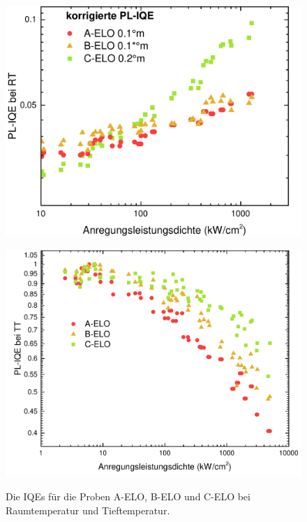\begin{figure}[h]
  \centering
  \begin{minipage}[t]{0.49\textwidth}
    \centering
    \includegraphics[width=\textwidth]{Bilder/TS4045/corrIQERT.pdf}
    \label{fig:eloiqeRT}
  \end{minipage}
	\hfill
  \begin{minipage}[t]{0.49\textwidth}
    \centering
    \includegraphics[width=\linewidth]{Bilder/TS4045/IQETT.pdf}
    \label{fig:elocorriqeRT}
  \end{minipage}
	\caption{Die IQEs für die Proben A-ELO, B-ELO und C-ELO bei Raumtemperatur und Tieftemperatur.}
\end{figure}
